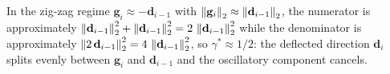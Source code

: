 In the zig-zag regime $\mathbf{g}_i \approx -\mathbf{d}_{i-1}$ with $\left\lVert \mathbf{g}_i \right\rVert_2 \approx \left\lVert \mathbf{d}_{i-1} \right\rVert_2$, the numerator is approximately $\left\lVert \mathbf{d}_{i-1} \right\rVert_2^{2} + \left\lVert \mathbf{d}_{i-1} \right\rVert_2^{2} = 2\,\left\lVert \mathbf{d}_{i-1} \right\rVert_2^{2}$ while the denominator is approximately $\left\lVert 2\,\mathbf{d}_{i-1} \right\rVert_2^{2} = 4\,\left\lVert \mathbf{d}_{i-1} \right\rVert_2^{2}$, so $\gamma^{*} \approx 1/2$: the deflected direction $\mathbf{d}_i$ splits evenly between $\mathbf{g}_i$ and $\mathbf{d}_{i-1}$ and the oscillatory component cancels.
